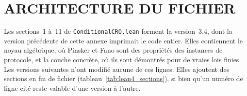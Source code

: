 \section{ARCHITECTURE DU FICHIER}
\label{sec:lean4_architecture}

\begin{sloppypar}
Les sections~1 \`a~11 de \texttt{ConditionalCRO.lean} forment la version~3.4, dont la
version pr\'ec\'edente de cette annexe imprimait le code entier. Elles contiennent le noyau alg\'ebrique, o\`u Pinsker et Fano sont des
propri\'et\'es des instances de protocole, et la couche concr\`ete, o\`u ils sont d\'emontr\'es
pour de vraies lois finies. Les versions suivantes n'ont modifi\'e aucune de ces lignes.
Elles ajoutent des sections en fin de fichier (tableau~\ref{tab:lean4_sections}), si bien
qu'un num\'ero de ligne cit\'e reste valable d'une version \`a l'autre.
\end{sloppypar}

